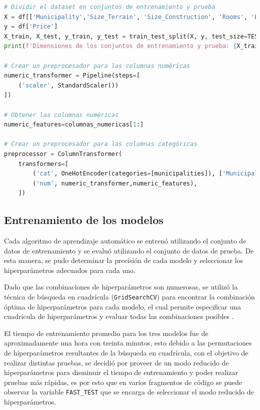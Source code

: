 \begin{lstlisting}[language=python, caption={Preprocesamiento de los datos}, label={lst:preprocesamiento}]
# Dividir el dataset en conjuntos de entrenamiento y prueba
X = df[['Municipality','Size_Terrain', 'Size_Construction', 'Rooms', 'Bathrooms', 'Parking', 'Age', 'Lat', 'Lng']]
y = df['Price']
X_train, X_test, y_train, y_test = train_test_split(X, y, test_size=TEST_SIZE, random_state=RANDOM_STATE)
print(f'Dimensiones de los conjuntos de entrenamiento y prueba: {X_train.shape}, {X_test.shape}')

# Crear un preprocesador para las columnas numéricas
numeric_transformer = Pipeline(steps=[
    ('scaler', StandardScaler())
])

# Obtener las columnas numéricas
numeric_features=columnas_numericas[1:]

# Crear un preprocesador para las columnas categóricas
preprocessor = ColumnTransformer(
    transformers=[
        ('cat', OneHotEncoder(categories=[municipalities]), ['Municipality']),
        ('num', numeric_transformer,numeric_features),
    ])
\end{lstlisting}

\subsection{Entrenamiento de los modelos}
Cada algoritmo de aprendizaje automático se entrenó utilizando el conjunto de
datos de entrenamiento y se evaluó utilizando el conjunto de datos de prueba.
De esta manera, se pudo determinar la precisión de cada modelo y seleccionar
los hiperparámetros adecuados para cada uno.

Dado que las combinaciones de hiperparámetros son numerosas, se utilizó la
técnica de búsqueda en cuadrícula (\texttt{GridSearchCV}) para encontrar la
combinación óptima de hiperparámetros para cada modelo, el cual permite especificar
una cuadrícula de hiperparámetros y evaluar todas las combinaciones posibles \cite{sklearn_gridsearchcv}.

El tiempo de entrenamiento promedio para los tres modelos fue de aproximadamente
una hora con treinta minutos, esto debido a las permutaciones de hiperparámetros
resultantes de la búsqueda en cuadrícula, con el objetivo de realizar distintas
pruebas, se decidió por proveer de un modo reducido de hiperparámetros para
disminuir el tiempo de entrenamiento y poder realizar pruebas más rápidas, es
por esto que en varios fragmentos de código se puede observar la variable
\texttt{FAST\_TEST} que se encarga de seleccionar el modo reducido de hiperparámetros.

